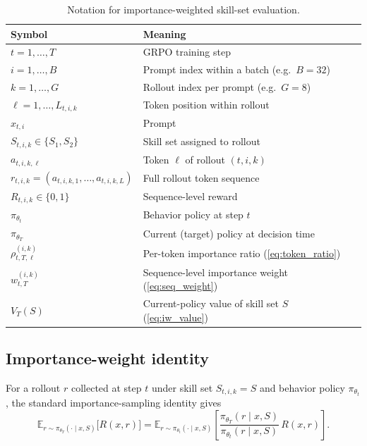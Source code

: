 \begin{table}[ht]
\centering
\caption{Notation for importance-weighted skill-set evaluation.}
\label{tab:iw_notation}
\begin{tabular}{@{}ll@{}}
\toprule
\textbf{Symbol} & \textbf{Meaning} \\
\midrule
$t = 1, \ldots, T$ & GRPO training step \\
$i = 1, \ldots, B$ & Prompt index within a batch (e.g.\ $B=32$) \\
$k = 1, \ldots, G$ & Rollout index per prompt (e.g.\ $G=8$) \\
$\ell = 1, \ldots, L_{t,i,k}$ & Token position within rollout \\
$x_{t,i}$ & Prompt \\
$S_{t,i,k} \in \{S_1, S_2\}$ & Skill set assigned to rollout \\
$a_{t,i,k,\ell}$ & Token $\ell$ of rollout $(t,i,k)$ \\
$r_{t,i,k} = (a_{t,i,k,1}, \ldots, a_{t,i,k,L})$ & Full rollout token sequence \\
$R_{t,i,k} \in \{0,1\}$ & Sequence-level reward \\
$\pi_{\theta_t}$ & Behavior policy at step $t$ \\
$\pi_{\theta_T}$ & Current (target) policy at decision time \\
$\rho_{t,T,\ell}^{(i,k)}$ & Per-token importance ratio (\cref{eq:token_ratio}) \\
$w_{t,T}^{(i,k)}$ & Sequence-level importance weight (\cref{eq:seq_weight}) \\
$V_T(S)$ & Current-policy value of skill set $S$ (\cref{eq:iw_value}) \\
\bottomrule
\end{tabular}
\end{table}

\subsection{Importance-weight identity}
\label{app:iw:identity}

For a rollout $r$ collected at step $t$ under skill set $S_{t,i,k} = S$ and behavior policy $\pi_{\theta_t}$, the standard importance-sampling identity gives
\begin{equation}
    \mathbb{E}_{r \sim \pi_{\theta_T}(\cdot \mid x, S)}\bigl[R(x, r)\bigr]
    = \mathbb{E}_{r \sim \pi_{\theta_t}(\cdot \mid x, S)}\!\left[\frac{\pi_{\theta_T}(r \mid x, S)}{\pi_{\theta_t}(r \mid x, S)}\, R(x, r)\right].
\end{equation}

